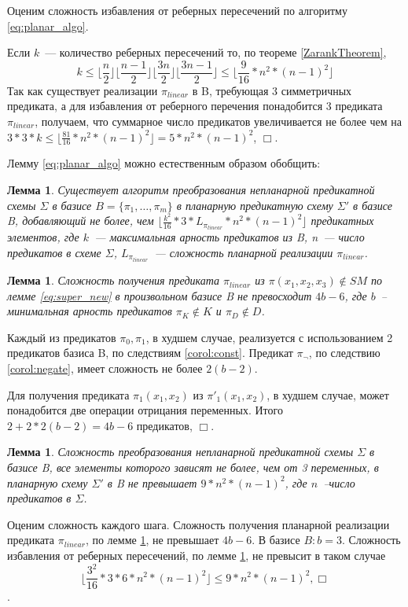 \documentclass[12pt]{extarticle}
\newtheorem{lemma}[theorem]{Лемма}
\newenvironment{proof}[1][Доказательство.]{\begin{trivlist}
\item[\hskip \labelsep {\bfseries #1}]}{\end{trivlist}}
\begin{document}
\begin{proof}
Оценим сложность избавления от реберных пересечений по алгоритму \ref{eq:planar_algo}.

Если $k$~--- количество реберных пересечений то, по теореме \ref{ZarankTheorem}, 
$$k \leq \lfloor \frac{n}{2} \rfloor \lfloor \frac{n-1}{2} \rfloor \lfloor \frac{3n}{2} \rfloor \lfloor \frac{3n-1}{2} \rfloor \le \lfloor \frac{9}{16} * n^2*(n-1)^2 \rfloor$$
Так как существует реализации $\pi_{linear}$ в B, требующая 3 симметричных предиката, а для избавления
от реберного перечения понадобится 3 предиката $\pi_{linear}$, получаем, 
что суммарное число предикатов увеличивается не более чем на
$3*3*k \leq \lfloor \frac{81}{16} * n^2 * (n-1)^2 \rfloor = 5 * n^2 * (n-1)^2$, $\Box$.
\end{proof}

Лемму \ref{eq:planar_algo} можно естественным образом обобщить:
\begin{lemma}
\label{general_planar_algo_complexity}
Существует алгоритм преобразования непланарной предикатной схемы $\Sigma$ в базисе $B = \{\pi_1, \dots, \pi_m \}$
в планарную предикатную схему $\Sigma'$ в базисе B, добавляющий не более, чем $\lfloor \frac{k^2}{16} * 3 * L_{\pi_{linear}} * n^2*(n-1)^2 \rfloor$ 
предикатных элементов, где $k$~--- максимальная арность предикатов из B, n~--- число предикатов в схеме $\Sigma$, 
$L_{\pi_{linear}}$~--- сложность планарной реализации $\pi_{linear}$.
\end{lemma}

\begin{lemma}
\label{complexity}
Сложность получения предиката $\pi_{linear}$ из $\pi(x_1, x_2, x_3) \notin SM$ по лемме \ref{eq:super_new}
в произвольном базисе B не 
превосходит $4b - 6$, где $b$~-- минимальная арность предикатов $\pi_K \notin K$ и $\pi_D \notin D$.
\end{lemma}
\begin{proof}
Каждый из предикатов $\pi_0, \pi_1$, в худшем случае, реализуется с использованием 2 предикатов базиса B,
по следствиям \ref{corol:const}. Предикат $\pi_{\neg}$, по следствию \ref{corol:negate}, имеет сложность не более $2(b-2)$.

Для получения предиката  $\pi_1(x_1, x_2)$ из $\pi'_1(x_1, x_2)$, в худшем случае, может понадобится 
две операции отрицания переменных.
Итого $2 + 2 * 2(b-2) = 4b - 6$ предикатов, $\Box$.
\end{proof}

\begin{lemma}
Сложность преобразования непланарной предикатной схемы $\Sigma$ в базисе B, 
все элементы которого зависят не более, чем от 3 переменных, 
в планарную схему $\Sigma'$ в B не превышает $9 * n^2 * (n-1)^2$, где $n$~--число предикатов в $\Sigma$.
\end{lemma}
\begin{proof}
Оценим сложность каждого шага. Сложность получения планарной реализации предиката $\pi_{linear}$, по лемме \ref{complexity},
не превышает $4b - 6$. В базисе $B: b=3$. Сложность избавления от реберных пересечений, по лемме \ref{general_planar_algo_complexity}, не 
превысит в таком случае $$\lfloor \frac{3^2}{16} * 3 * 6 * n^2 * (n-1)^2 \rfloor \le 9 * n^2 * (n-1)^2, \Box$$.
\end{proof}
\end{document}
